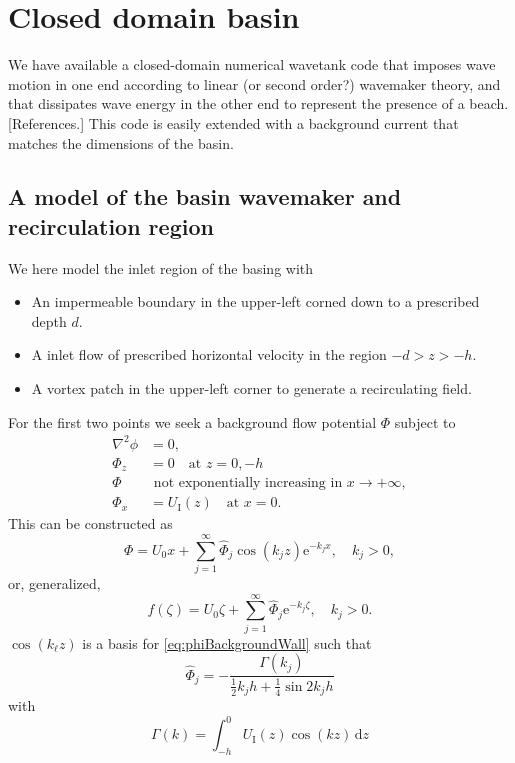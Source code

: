 \documentclass[a4paper,12pt]{article}
\newcommand{\mr}{\mathrm}
\newcommand{\ee}{\mr{e}}
\renewcommand{\_}[1]{_\mr{#1}}
\begin{document}
\section{Closed domain basin}
We have available a closed-domain numerical wavetank code that imposes wave motion in one end according to linear (or second order?) wavemaker theory, and that dissipates wave energy in the other end to represent the presence of a beach. [References.]
This code is easily extended with a background current that matches the dimensions of the basin.

\subsection{A model of the basin wavemaker and recirculation region}
We here model the inlet region of the basing with
\begin{itemize}
	\item An impermeable boundary in the upper-left corned down to a prescribed depth $d$.
	\item A inlet flow of prescribed horizontal velocity in the region $-d>z>-h$.
	\item A vortex patch in the upper-left corner to generate a recirculating field. 
\end{itemize}
For the first two points we seek a background flow potential $\Phi$ subject to 
\begin{align*}
\nabla^2\phi&=0,\\
\Phi_z &= 0 \quad \text{at } z=0,-h\\
\Phi &\text{ not exponentially increasing in }x\to+\infty,\\
\Phi_x &= U\_I(z) \quad \text{at } x=0.
\end{align*}
This can be constructed as
\begin{equation}
\Phi =U_0 x+ \sum_{j=1}^\infty \hat\Phi_j \cos(k_j z)\ee^{-k_j x}, \quad k_j>0,
\label{eq:phiBackgroundWall}
\end{equation}
or, generalized,
\begin{equation}
f(\zeta) = U_0 \zeta+ \sum_{j=1}^\infty \hat\Phi_j \ee^{-k_j\zeta}, \quad k_j>0.
\label{eq:f_wall}
\end{equation}
$\cos(k_\ell z)$ is a basis for \eqref{eq:phiBackgroundWall} such that
\[
\hat\Phi_j = -\frac{\Gamma(k_j)}{\frac12 k_j h + \frac14\sin2k_jh}
\]
with
\begin{equation}
\Gamma(k) = \int_{-h}^0 \!U\_I(z)\cos(k z)\,\mr d z
\label{eq:Gamma}
\end{equation}
\end{document}
